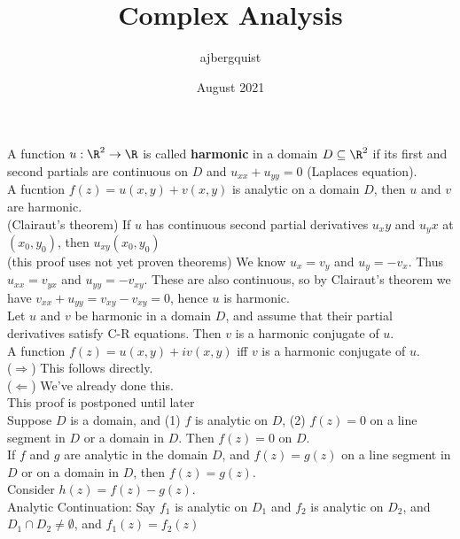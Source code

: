 \documentclass{article}
\title{Complex Analysis}
\author{ajbergquist }
\date{August 2021}
\begin{document}
 A function $u:\R^2\rightarrow \R$ is called \textbf{harmonic} in a domain $D\subseteq\R^2$ if its first and second partials are continuous on $D$ and $u_{xx} + u_{yy} = 0$ (Laplaces equation). \\

 A fucntion $f(z) = u(x,y) + v(x,y)$ is analytic on a domain $D$, then $u$ and $v$ are harmonic.\\

(Clairaut's theorem) If $u$ has continuous second partial derivatives $u_xy$ and $u_yx$ at $(x_0,y_0)$, then $u_{xy}(x_0,y_0)$\\

 (this proof uses not yet proven theorems) We know $u_x = v_y$ and $u_y = -v_x$. Thus $u_{xx} = v_{yx}$ and $u_{yy} = -v_{xy}$. These are also continuous, so by Clairaut's theorem we have $v_{xx} + u_{yy} = v_{xy} - v_{xy} = 0$, hence $u$ is harmonic.\\

 Let $u$ and $v$ be harmonic in a domain $D$, and assume that their partial derivatives satisfy C-R equations. Then $v$ is a harmonic conjugate of $u$.\\

 A function $f(z) = u(x,y)+ i v(x,y)$ iff $v$ is a harmonic conjugate of $u$.\\
 ($\Rightarrow$) This follows directly.\\
($\Leftarrow$) We've already done this.\\
 This proof is postponed until later
\\

 Suppose $D$ is a domain, and (1) $f$ is analytic on $D$, (2) $f(z) = 0$ on a line segment in $D$ or a domain in $D$. Then $f(z) = 0$ on $D$.\\
 If $f$ and $g$ are analytic in the domain $D$, and $f(z) = g(z)$ on a line segment in $D$ or on a domain in $D$, then $f(z) = g(z)$.\\
 Consider $h(z) = f(z) - g(z)$. \\

 Analytic Continuation: Say $f_1$ is analytic on $D_1$ and $f_2$ is analytic on $D_2$, and $D_1\cap D_2 \ne \emptyset$, and $f_1(z) = f_2(z)$

 
\end{document}
